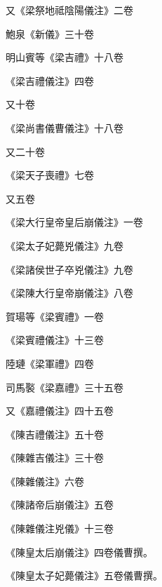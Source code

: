 \begin{pinyinscope}
 又《梁祭地祗陰陽儀注》二卷



 鮑泉《新儀》三十卷



 明山賓等《梁吉禮》十八卷



 《梁吉禮儀注》四卷



 又十卷



 《梁尚書儀曹儀注》十八卷



 又二十卷



 《梁天子喪禮》七卷



 又五卷



 《梁大行皇帝皇后崩儀注》一卷



 《梁太子妃薨兇儀注》九卷



 《梁諸侯世子卒兇儀注》九卷



 《梁陳大行皇帝崩儀注》八卷



 賀瑒等《梁賓禮》一卷



 《梁賓禮儀注》十三卷



 陸璉《梁軍禮》四卷



 司馬褧《梁嘉禮》三十五卷



 又《嘉禮儀注》四十五卷



 《陳吉禮儀注》五十卷



 《陳雜吉儀注》三十卷



 《陳雜儀注》六卷



 《陳諸帝后崩儀注》五卷



 《陳雜儀注兇儀》十三卷



 《陳皇太后崩儀注》四卷儀曹撰。



 《陳皇太子妃薨儀注》五卷儀曹撰。




\end{pinyinscope}
